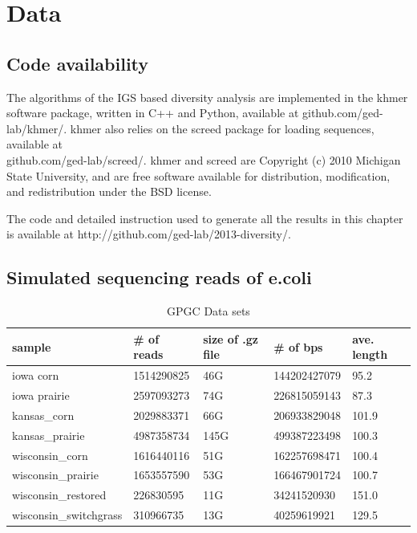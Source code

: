 \section{Data}


\subsection{Code availability}
The algorithms of the IGS based diversity analysis are implemented 
 in the khmer software
package, written in C++ and Python, available at github.com/ged-lab/khmer/.
 khmer also relies on the screed package for loading
sequences, available at \\
github.com/ged-lab/screed/.
khmer and screed are Copyright (c) 2010 Michigan State University, and are free
software available for distribution, modification, and redistribution under the
BSD license.

The code and detailed instruction used to generate all the results in this 
chapter is available at
http://github.com/ged-lab/2013-diversity/. 


\subsection{Simulated sequencing reads of e.coli}




\begin{table}[h]
\caption{GPGC Data sets}
\label{my-label}
\begin{tabular}{|l|l|l|l|l|}
\hline
sample & \# of reads & size of .gz file & \# of bps & ave. length \\ \hline
iowa corn & 1514290825 & 46G & 144202427079 & 95.2 \\ \hline
iowa prairie & 2597093273 & 74G & 226815059143 & 87.3 \\ \hline
kansas\_corn & 2029883371 & 66G & 206933829048 & 101.9 \\ \hline
kansas\_prairie & 4987358734 & 145G & 499387223498 & 100.3 \\ \hline
wisconsin\_corn & 1616440116 & 51G & 162257698471 & 100.4 \\ \hline
wisconsin\_prairie & 1653557590 & 53G & 166467901724 & 100.7 \\ \hline
wisconsin\_restored & 226830595 & 11G & 34241520930 & 151.0 \\ \hline
wisconsin\_switchgrass & 310966735 & 13G & 40259619921 & 129.5 \\ \hline
\end{tabular}
\label{table:gpgc}
\end{table}

